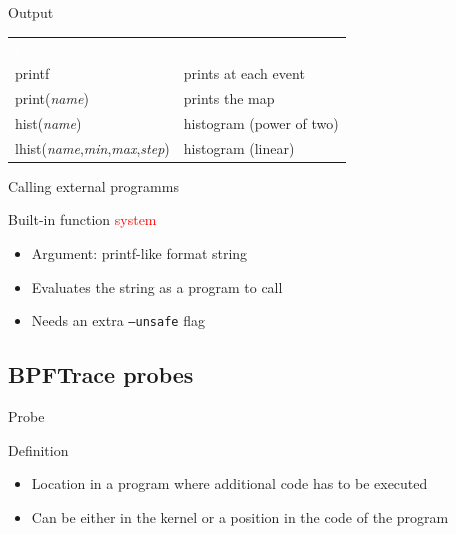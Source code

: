 \begin{reveals}
\begin{frame}[c]{Output}
  
  \begin{center}
      \color{deepblue}
    \begin{tabular}{|ll|}
      \arrayrulecolor{deepblue}
          {\cellcolor{deepblue}\textcolor{white}{Function Name}} &
                                                          {\cellcolor{deepblue}\textcolor{white}{Usage}} \\
      printf & prints at each event\\
      print(\emph{name}) & prints the map\\
      hist(\emph{name})& histogram (power of two)\\
      lhist(\emph{name},\emph{min},\emph{max},\emph{step})& histogram (linear)\\\hline
    \end{tabular}
  \end{center}
\end{frame}


\begin{frame}[c]{Calling external programms}
  
  \begin{block}{Built-in function \textcolor{red}{system}}
    \begin{itemize}
    \item Argument: printf-like format string
    \item Evaluates the string as a program to call 
    \item Needs an extra \texttt{--unsafe} flag
    \end{itemize}
  \end{block}

\end{frame}

\subsection{BPFTrace probes}

\begin{frame}[c]{Probe}
  
  \begin{block}{Definition}
    \begin{itemize}
    \item Location in a program where additional code has to be
      executed
    \item Can be either in the kernel or a position in the code of the
      program
    \end{itemize}
  \end{block}


\end{frame}
\end{reveals}
